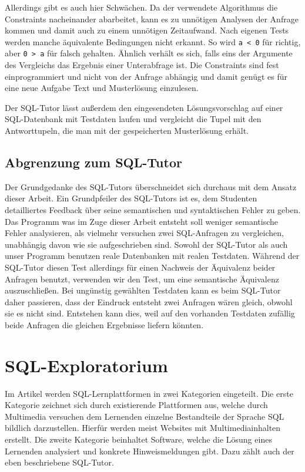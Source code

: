 Allerdings gibt es auch hier Schwächen. Da der verwendete Algorithmus die Constraints nacheinander abarbeitet, kann es zu unnötigen Analysen der Anfrage kommen und damit auch zu einem unnötigen Zeitaufwand. Nach eigenen Tests werden manche äquivalente Bedingungen nicht erkannt. So wird \verb|a < 0| für richtig, aber \verb|0 > a| für falsch gehalten. Ähnlich verhält es sich, falls eins der Argumente des Vergleichs das Ergebnis einer Unterabfrage ist. Die Constraints sind fest einprogrammiert und nicht von der Anfrage abhängig und damit genügt es für eine neue Aufgabe Text und Musterlösung einzulesen. 

Der SQL-Tutor lässt außerdem den eingesendeten Lösungsvorschlag auf einer SQL-Datenbank mit Testdaten laufen und vergleicht die Tupel mit den Antworttupeln, die man mit der gespeicherten Musterlösung erhält.

\subsection*{Abgrenzung zum SQL-Tutor}

Der Grundgedanke des SQL-Tutors überschneidet sich durchaus mit dem Ansatz dieser Arbeit. Ein Grundpfeiler des SQL-Tutors ist es, dem Studenten detailliertes Feedback über seine semantischen und syntaktischen Fehler zu geben. Das Programm was im Zuge dieser Arbeit entsteht soll weniger semantische Fehler analysieren, als vielmehr versuchen zwei SQL-Anfragen zu vergleichen, unabhängig davon wie sie aufgeschrieben sind. Sowohl der SQL-Tutor als auch unser Programm benutzen reale Datenbanken mit realen Testdaten. Während der SQL-Tutor diesen Test allerdings für einen Nachweis der Äquivalenz beider Anfragen benutzt, verwenden wir den Test, um eine semantische Äquivalenz auszuschließen. Bei ungünstig gewählten Testdaten kann es beim SQL-Tutor daher passieren, dass der Eindruck entsteht zwei Anfragen wären gleich, obwohl sie es nicht sind. Entstehen kann dies, weil auf den vorhanden Testdaten zufällig beide Anfragen die gleichen Ergebnisse liefern könnten.

\section{SQL-Exploratorium}

Im Artikel \cite{explora1} werden SQL-Lernplattformen in zwei Kategorien eingeteilt. Die erste Kategorie zeichnet sich durch existierende Plattformen aus, welche durch Multimedia versuchen dem Lernenden einzelne Bestandteile der Sprache SQL bildlich darzustellen. Hierfür werden meist Websites mit Multimediainhalten erstellt. Die zweite Kategorie beinhaltet Software, welche die Lösung eines Lernenden analysiert und konkrete Hinweismeldungen gibt. Dazu zählt auch der eben beschriebene SQL-Tutor.

